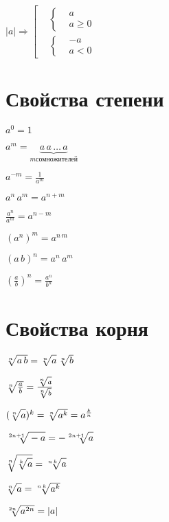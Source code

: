 $ |a| \Rightarrow \left[ \begin{aligned}
	& \left\{ \begin{aligned}
		& a \\
		& a \geqslant 0
	\end{aligned}\right. \\
	& \left\{ \begin{aligned}
		& -a \\
		& a < 0
	\end{aligned}\right.
\end{aligned}\right. $


\section{Свойства степени}

$ a^0 = 1 $

$ a^m = \underbrace{a\, a \, \ldots \, a }_{m сомножителей} $

$ a^{-m} = \frac{1}{a^m} $

$ a^n\, a^m = a^{n+m} $

$ \frac{a^n}{a^m} = a^{n-m} $

$ (a^n)^m = a^{n\, m} $

$ (a\, b)^n = a^n\, a^m $

$ \left(\frac{a}{b} \right)^n = \frac{a^n}{b^n} $


\section{Свойства корня}

$ \sqrt[n]{\mathstrut a\, b} = \sqrt[n]{\mathstrut a} \, \sqrt[n]{\mathstrut b} $

$ \sqrt[n]{\mathstrut \frac{a}{b}} = \frac{\sqrt[n]{\mathstrut a}}{\sqrt[n]{\mathstrut b}} $

$ (\sqrt[n]{\mathstrut a})^k = \sqrt[n]{\mathstrut a^k} = a^{\frac{k}{n}} $

$ \sqrt[2n + 1]{\mathstrut -a} = -\sqrt[2n + 1]{\mathstrut a} $

$ \sqrt[n]{\mathstrut \sqrt[k]{\mathstrut a}} = \sqrt[n\, k]{\mathstrut a} $

$ \sqrt[n]{\mathstrut a} = \sqrt[n\, k]{\mathstrut a^k} $

$ \sqrt[2n]{\mathstrut a^{2n}} = |a| $

